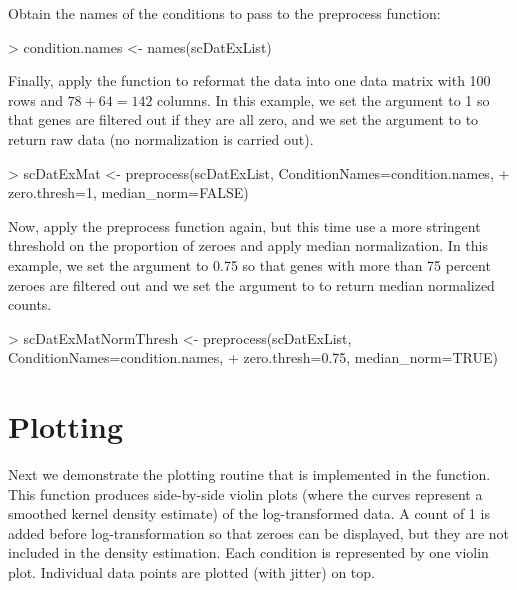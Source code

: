 \documentclass{article}
\begin{document}
Obtain the names of the conditions to pass to the preprocess function:
\begin{Schunk}
\begin{Sinput}
> condition.names <- names(scDatExList)
\end{Sinput}
\end{Schunk}

Finally, apply the  function to reformat the data into one data matrix with 100 rows and $78+64=142$ columns.  In this example, we set the  argument to 1 so that genes are filtered out if they are all zero, and we set the  argument to  to return raw data (no normalization is carried out).

\begin{Schunk}
\begin{Sinput}
> scDatExMat <- preprocess(scDatExList, ConditionNames=condition.names, 
+                         zero.thresh=1, median_norm=FALSE)
\end{Sinput}
\end{Schunk}

Now, apply the preprocess function again, but this time use a more stringent threshold on the proportion of zeroes and apply median normalization.  In this example, we set the  argument to 0.75 so that genes with more than 75 percent zeroes are filtered out and we set the  argument to  to return median normalized counts.

\begin{Schunk}
\begin{Sinput}
> scDatExMatNormThresh <- preprocess(scDatExList, ConditionNames=condition.names, 
+                                    zero.thresh=0.75, median_norm=TRUE)
\end{Sinput}
\end{Schunk}

\section{Plotting}

Next we demonstrate the plotting routine that is implemented in the  function.  This function produces side-by-side violin plots (where the curves represent a smoothed kernel density estimate)
of the log-transformed data.  A count of 1 is added before log-transformation so that zeroes can be displayed, but they are not included in the density estimation.  Each condition is represented by one violin plot.  Individual data points are plotted (with jitter) on top. 
\end{document}
